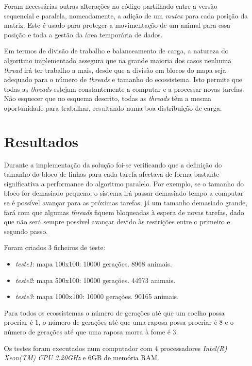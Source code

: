 \documentclass[12pt]{article}
\begin{document}
Foram necessárias outras alterações no código partilhado entre a versão sequencial e paralela, nomeadamente,
a adição de um \textit{mutex} para cada posição da matriz. Este é usado para proteger a movimentação
de um animal para essa posição e toda a gestão da área temporária de dados.

Em termos de divisão de trabalho e balanceamento de carga, a natureza do algoritmo implementado
assegura que na grande maioria dos casos nenhuma \textit{thread} irá ter trabalho a mais,
desde que a divisão em blocos do mapa seja adequado para o número de \textit{threads} e tamanho do ecossistema.
Isto permite que todas as \textit{threads} estejam constantemente a computar e a processar
novas tarefas. Não esquecer que no esquema descrito, todas as \textit{threads} têm a mesma oportunidade
para trabalhar, resultando numa boa distribuição de carga.

\section{Resultados}

Durante a implementação da solução foi-se verificando que a definição do tamanho do bloco de linhas
para cada tarefa afectava de forma bastante significativa a performance do algoritmo paralelo.
Por exemplo, se o tamanho do bloco for demasiado pequeno, o sistema irá passar demasiado tempo
a computar se é possível avançar para as próximas tarefas; já um tamanho demasiado grande,
fará com que algumas \textit{threads} fiquem bloqueadas à espera de novas tarefas, dado que não será sempre
possível avançar devido às restrições entre o primeiro e segundo passo.

Foram criados 3 ficheiros de teste:

\begin{itemize}
  \item \textit{teste1}: mapa 100x100: 10000 gerações. 8968 animais.
  \item \textit{teste2}: mapa 500x100: 10000 gerações. 44973 animais.
  \item \textit{teste3}: mapa 1000x100: 10000 gerações. 90165 animais.
\end{itemize}

Para todos os ecossistemas o número de gerações até que um coelho possa procriar é 1, o número
de gerações até que uma raposa possa procriar é 8 e o número de gerações até que uma raposa morra à fome é 3.

Os testes foram executados num computador com 4 processadores \textit{Intel(R) Xeon(TM) CPU 3.20GHz} e 6GB de
memória RAM.
\end{document}

